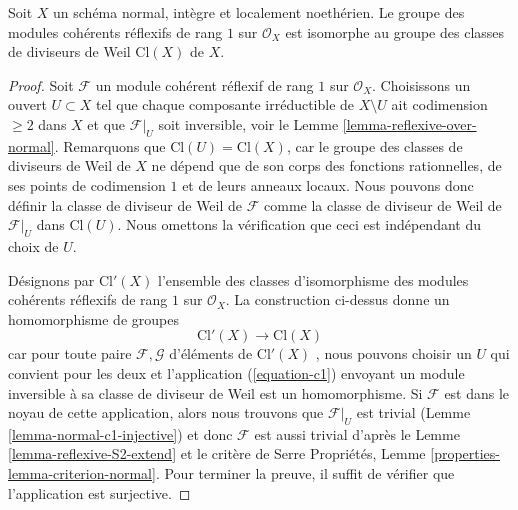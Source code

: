 \begin{lemma}
\label{lemma-normal-class-group}
Soit $X$ un schéma normal, intègre et localement noethérien. Le
groupe des modules cohérents réflexifs de rang $1$ sur $\mathcal{O}_X$ est isomorphe au
groupe des classes de diviseurs de Weil $\text{Cl}(X)$  de  $X$.
\end{lemma}

\begin{proof}
Soit $\mathcal{F}$ un module cohérent réflexif de rang $1$ sur $\mathcal{O}_X$.
Choisissons un ouvert $U \subset X$  tel que chaque composante irréductible
de  $X \setminus U$ ait codimension $\geq 2$ dans $X$  et que
 $\mathcal{F}|_U$  soit inversible, voir le Lemme  \ref{lemma-reflexive-over-normal}. Remarquons que
 $\text{Cl}(U) = \text{Cl}(X)$, car le groupe des classes de diviseurs de Weil de $X$ ne
dépend que de son corps des fonctions rationnelles, de ses points de
codimension $1$ et de leurs anneaux locaux. Nous pouvons donc définir la
classe de diviseur de Weil de  $\mathcal{F}$ comme la classe de diviseur de Weil
de $\mathcal{F}|_U$ dans $\text{Cl}(U)$. Nous omettons la vérification que ceci est
indépendant du choix de  $U$.

\medskip\noindent
Désignons par  $\text{Cl}'(X)$  l'ensemble des classes d'isomorphisme des modules
cohérents réflexifs de rang  $1$  sur  $\mathcal{O}_X$. La construction ci-dessus donne
un homomorphisme de groupes
$$
\text{Cl}'(X) \longrightarrow \text{Cl}(X)
$$
car pour toute paire  $\mathcal{F}, \mathcal{G}$  d'éléments de  $\text{Cl}'(X)$ , nous pouvons choisir
un  $U$  qui convient pour les deux et l'application (\ref{equation-c1})
envoyant un module inversible à sa classe de diviseur de Weil est un
homomorphisme. Si  $\mathcal{F}$  est dans le noyau de cette application, alors nous
trouvons que  $\mathcal{F}|_U$  est trivial (Lemme  \ref{lemma-normal-c1-injective}) et donc  $\mathcal{F}$ 
est aussi trivial d'après le Lemme  \ref{lemma-reflexive-S2-extend}  et le critère de Serre Propriétés,
Lemme  \ref{properties-lemma-criterion-normal}. Pour terminer la preuve, il suffit de vérifier que
l'application est surjective.


\end{proof}
